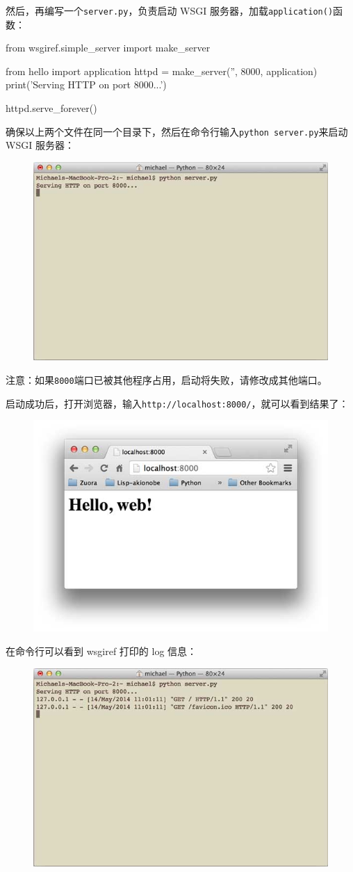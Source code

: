 然后，再编写一个\texttt{server.py}，负责启动 WSGI
服务器，加载\texttt{application()}函数：

\begin{pythoncode}
from wsgiref.simple_server import make_server

from hello import application
httpd = make_server('', 8000, application)
print('Serving HTTP on port 8000...')

httpd.serve_forever()
\end{pythoncode}

确保以上两个文件在同一个目录下，然后在命令行输入\texttt{python\ server.py}来启动
WSGI 服务器：

 
 \begin{figure}[htp]
	\centering
	\includegraphics[width=0.6\linewidth]{fig/950751913543456.png}
\end{figure}


注意：如果\texttt{8000}端口已被其他程序占用，启动将失败，请修改成其他端口。

启动成功后，打开浏览器，输入\texttt{http://localhost:8000/}，就可以看到结果了：

 
 \begin{figure}[htp]
	\centering
	\includegraphics[width=0.6\linewidth]{fig/950751878708448.png}
\end{figure}


在命令行可以看到 wsgiref 打印的 log 信息：

 
 \begin{figure}[htp]
	\centering
	\includegraphics[width=0.6\linewidth]{fig/950751840957632.png}
\end{figure}


